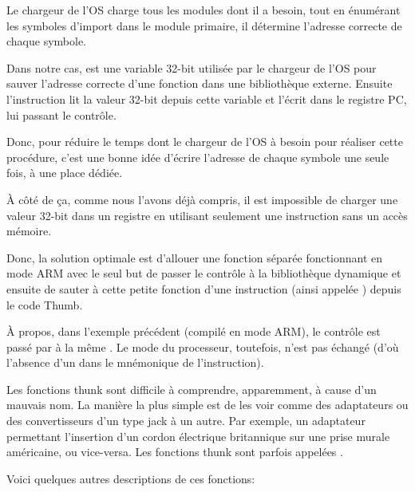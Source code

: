 Le chargeur de l'\ac{OS} charge tous les modules dont il a besoin, tout en énumérant
les symboles d'import dans le module primaire, il détermine l'adresse correcte de
chaque symbole.

Dans notre cas,  est une variable 32-bit utilisée par le
chargeur de l'\ac{OS} pour sauver l'adresse correcte d'une fonction dans une
bibliothèque externe.
Ensuite l'instruction  lit la valeur 32-bit depuis cette variable et
l'écrit dans le registre \ac{PC}, lui passant le contrôle.

Donc, pour réduire le temps dont le chargeur de l'\ac{OS} à besoin pour réaliser
cette procédure, c'est une bonne idée d'écrire l'adresse de chaque symbole une
seule fois, à une place dédiée.


À côté de ça, comme nous l'avons déjà compris, il est impossible de charger
une valeur 32-bit dans un registre en utilisant seulement une instruction
sans un accès mémoire.

Donc, la solution optimale est d'allouer une fonction séparée fonctionnant en
mode ARM avec le seul but de passer le contrôle à la bibliothèque dynamique et
ensuite de sauter à cette petite fonction d'une instruction (ainsi appelée
) depuis le code Thumb.

À propos, dans l'exemple précédent (compilé en mode ARM), le contrôle est
passé par  à la même .
Le mode du processeur, toutefois, n'est pas échangé (d'où l'absence d'un 
dans le mnémonique de l'instruction).


Les fonctions thunk sont difficile à comprendre, apparemment, à cause d'un
mauvais nom.
La manière la plus simple est de les voir comme des adaptateurs ou des
convertisseurs d'un type jack à un autre.
Par exemple, un adaptateur permettant l'insertion d'un cordon électrique
britannique sur une prise murale américaine, ou vice-versa.
Les fonctions thunk sont parfois appelées .

Voici quelques autres descriptions de ces fonctions:

